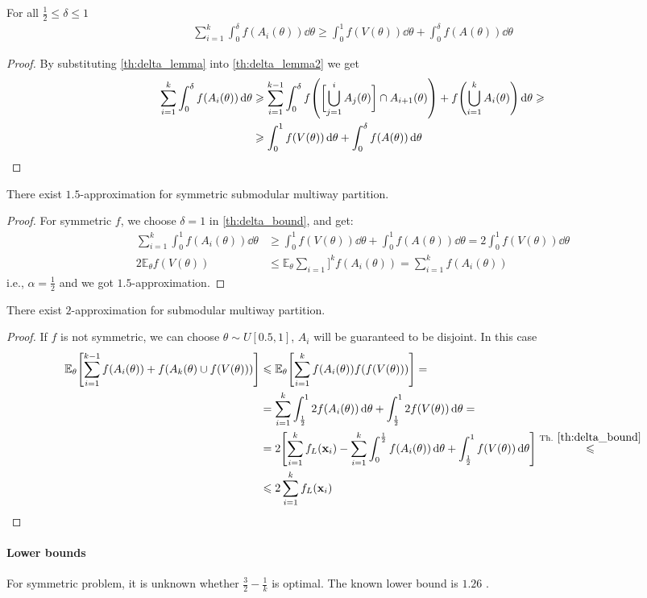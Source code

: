 \begin{theorem} \label{th:delta_bound}
	For all $\frac{1}{2} \leqslant \delta \leqslant 1$
	\begin{align}
	\sum_{i=1}^k \int_0^\delta f(A_i(\theta)) \dd{\theta} \geqslant \int_0^1 f(V(\theta)) \dd{\theta} + \int_0^\delta f(A(\theta))\dd{\theta}
	\end{align}
	\begin{proof}
		By substituting \vref{th:delta_lemma} into \vref{th:delta_lemma2} we get
		\begin{align}
		\sum_{i=1}^k \int_0^\delta f(A_i(\theta)) \dd{\theta} &\geqslant \sum_{i=1}^{k-1} \int_0^\delta f\qty(\qty\bigg[ \bigcup_{j=1}^{i} A_j(\theta)] \cap A_{i+1}(\theta))  +  f\qty(\bigcup_{i=1}^k A_i(\theta) )\dd{\theta}  \geqslant\\&\geqslant \int_0^1 f(V(\theta)) \dd{\theta} + \int_0^\delta f\qty(A(\theta) ) \dd{\theta}
		\end{align}
	\end{proof}
\end{theorem}
\begin{theorem}
	There exist $1.5$-approximation for symmetric submodular multiway partition.
	\begin{proof}
	For symmetric $f$, we choose $\delta = 1$ in \cref{th:delta_bound}, and get:
	\begin{align}
	\sum_{i=1}^k \int_0^1 f(A_i(\theta)) \dd{\theta} &\geqslant \int_0^1 f(V(\theta)) \dd{\theta} + \int_0^1 f(A(\theta))\dd{\theta} = 2\int_0^1 f(V(\theta)) \dd{\theta}\\ 
	2\mathbb{E}_\theta f(V(\theta)) &\leqslant  \mathbb{E}_\theta  \sum_{i=1}]^k  f(A_i(\theta)) =  \sum_{i=1}^{k} f(A_i(\theta))  
	\end{align}
	i.e., $\alpha = \frac{1}{2}$ and we got $1.5$-approximation.
	\end{proof}
\end{theorem}

\begin{theorem}
	There exist $2$-approximation for submodular multiway partition.
		\begin{proof}
If $f$ is not symmetric, we can choose $\theta\sim U[0.5,1]$, $A_i$ will be guaranteed to be disjoint. In this case
\begin{align}
\mathbb{E}_\theta \qty[\sum_{i=1}^{k-1} f(A_i(\theta)) + f(A_k(\theta) \cup f(V(\theta))) ] &\leqslant\mathbb{E}_\theta \qty[\sum_{i=1}^{k} f(A_i(\theta))  f(f(V(\theta))) ] =\\&= \sum_{i=1}^k \int_{\frac{1}{2}}^{1} 2 f(A_i(\theta))\dd{\theta} + \int_{\frac{1}{2}}^{1} 2 f(V(\theta)) \dd{\theta}  =\\&=
 2\qty[\sum_{i=1}^k f_L(\vb{x}_i) - \sum_{i=1}^k \int_0^{\frac{1}{2}}  f(A_i(\theta))\dd{\theta} + \int_{\frac{1}{2}}^{1}  f(V(\theta)) \dd{\theta}] \stackrel{\text{Th. }\ref{th:delta_bound}}{\leqslant}\\&\leqslant 2 \sum_{i=1}^k f_L(\vb{x}_i)
\end{align}	\end{proof}
\end{theorem}

\paragraph{Lower bounds} For symmetric problem, it is unknown whether $\frac{3}{2} - \frac{1}{k}$ is optimal. The known lower bound is $1.26$ \cite{ene2013local}.


